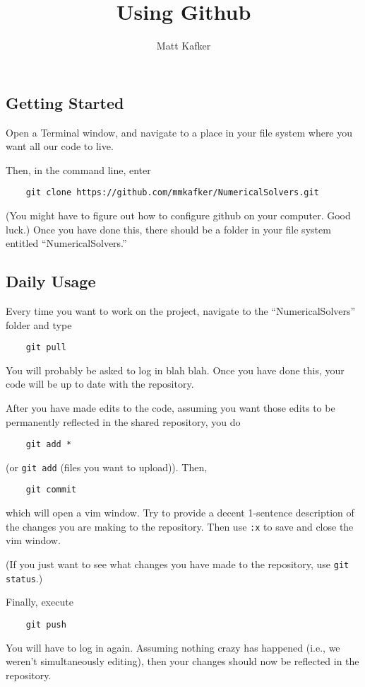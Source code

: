 \documentclass[10pt]{article}
\title {Using Github}
\author{Matt Kafker}
\begin{document}
\maketitle

\subsection*{Getting Started}
Open a Terminal window, and navigate to a place in your file system where you want all our code to live.

Then, in the command line, enter


\begin{verbatim}
	git clone https://github.com/mmkafker/NumericalSolvers.git
\end{verbatim}

(You might have to figure out how to configure github on your computer. Good luck.) Once you have done this, there should be a folder in your file system entitled ``NumericalSolvers.''

\subsection*{Daily Usage}
Every time you want to work on the project, navigate to the ``NumericalSolvers'' folder and type 

\begin{verbatim}
	git pull
\end{verbatim}
You will probably be asked to log in blah blah. Once you have done this, your code will be up to date with the repository.    

After you have made edits to the code, assuming you want those edits to be permanently reflected in the shared repository, you do

\begin{verbatim}
	git add *
\end{verbatim}
(or \verb|git add| (files you want to upload)). Then,
\begin{verbatim}
	git commit
\end{verbatim}
which will open a vim window. Try to provide a decent 1-sentence description of the changes you are making to the repository. Then use \verb|:x| to save and close the vim window.

(If you just want to see what changes you have made to the repository, use \verb|git status|.)

Finally, execute
\begin{verbatim}
	git push
\end{verbatim}
You will have to log in again. Assuming nothing crazy has happened (i.e., we weren't simultaneously editing), then your changes should now be reflected in the repository.
\end{document}
